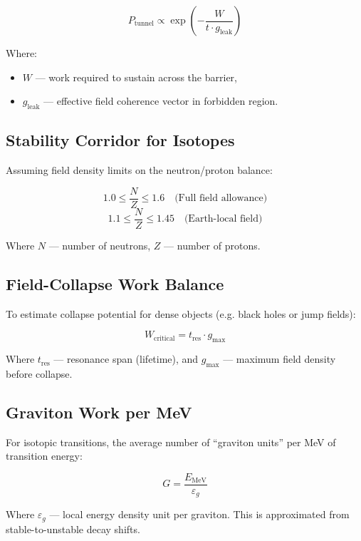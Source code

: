 \[
P_{\text{tunnel}} \propto \exp\left(-\frac{W}{t \cdot g_{\text{leak}}}\right)
\]

Where:
\begin{itemize}
    \item \( W \) — work required to sustain across the barrier,
    \item \( g_{\text{leak}} \) — effective field coherence vector in forbidden region.
\end{itemize}

\subsection{Stability Corridor for Isotopes}

Assuming field density limits on the neutron/proton balance:

\[
1.0 \leq \frac{N}{Z} \leq 1.6 \quad \text{(Full field allowance)}
\]
\[
1.1 \leq \frac{N}{Z} \leq 1.45 \quad \text{(Earth-local field)}
\]

Where \( N \) — number of neutrons, \( Z \) — number of protons.

\subsection{Field-Collapse Work Balance}

To estimate collapse potential for dense objects (e.g. black holes or jump fields):

\[
W_{\text{critical}} = t_{\text{res}} \cdot g_{\text{max}}
\]

Where \( t_{\text{res}} \) — resonance span (lifetime), and \( g_{\text{max}} \) — maximum field density before collapse.

\subsection{Graviton Work per MeV}

For isotopic transitions, the average number of “graviton units” per MeV of transition energy:

\[
G = \frac{E_{\text{MeV}}}{\varepsilon_g}
\]

Where \( \varepsilon_g \) — local energy density unit per graviton. This is approximated from stable-to-unstable decay shifts.

